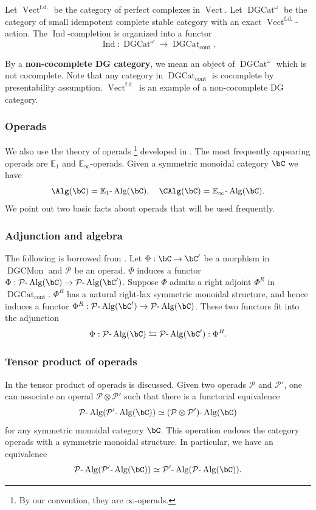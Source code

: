 \documentclass[10pt]{amsart}
\newcommand{\sssec}{\subsubsection}
\theoremstyle{remark}
\newcommand{\E}{\mathbb{E}}
\newcommand{\cP}{\mathcal{P}}
\newcommand{\on}{\operatorname}
\newcommand{\DGcat}{\on{DGCat}_{\on{cont}}}
\newcommand{\DGCatSymMon}{\on{DGCMon}}
\newcommand{\lAlg}{\text{-}\on{Alg}}
\newcommand{\Vect}{\on{Vect}}
\DeclareMathOperator{\Ind}{Ind}
\begin{document}
Let $\Vect^{\on{f.d.}}$ be the category of perfect complexes in $\Vect$.  Let $\on{DGCat}^{\omega}$ be the category of small idempotent complete stable category with an exact $\Vect^{\on{f.d.}}$-action. The $\Ind$-completion is organized into a functor
\[\Ind: \on{DGCat}^{\omega}\rightarrow \DGcat. \]

By a \textbf{non-cocomplete DG category}, we mean an object of $\on{DGCat}^{\omega}$ which is not cocomplete. Note that any category in $\DGcat$ is cocomplete by presentability assumption. $\Vect^{\on{f.d.}}$ is an example of a non-cocomplete DG category.

\sssec{Operads}
We also use the theory of operads \footnote{By our convention, they are $\infty$-operads.} developed in \cite{HA}. The most frequently appearing operads are $\E_1$ and $\E_{\infty}$-operads. Given a symmetric monoidal category $\bC$ we have
\[\Alg(\bC)=\E_1\lAlg(\bC),\quad \CAlg(\bC)=\E_{\infty}\lAlg(\bC).\]
We point out two basic facts about operads that will be used frequently.


\sssec{Adjunction and algebra}\label{sssec: adjunction and algebra}
The following is borrowed from \cite[Part II, Ch.6, Sect. 1.2.3]{GR2}.
Let $\Phi:\bC\rightarrow\bC'$ be a morphism in $\DGCatSymMon$ and $\cP$ be an operad. $\Phi$ induces a functor $\Phi:\cP\lAlg(\bC)\rightarrow \cP\lAlg(\bC')$. Suppose $\Phi$ admits a right adjoint $\Phi^R$ in $\DGcat$. $\Phi^R$ has a natural right-lax symmetric monoidal structure, and hence induces a functor $\Phi^R: \cP\lAlg(\bC')\rightarrow \cP\lAlg(\bC)$. These two functors fit into the adjunction
\[\Phi: \cP\lAlg(\bC)\leftrightarrows \cP\lAlg(\bC'): \Phi^R.\]

\sssec{Tensor product of operads}
In \cite[Sect. 2.2.5]{HA} the tensor product of operads is discussed. Given two operads $\cP$ and $\cP'$, one can associate an operad $\cP\otimes\cP'$ such that there is a functorial equivalence \[\cP\lAlg(\cP'\lAlg(\bC))\simeq (\cP\otimes\cP')\lAlg(\bC)\]
for any symmetric monoidal category $\bC$. This operation endows the category operads with a symmetric monoidal structure. In particular, we have an equivalence
\[\cP\lAlg(\cP'\lAlg(\bC))\simeq \cP'\lAlg(\cP\lAlg(\bC)).\]
\end{document}
